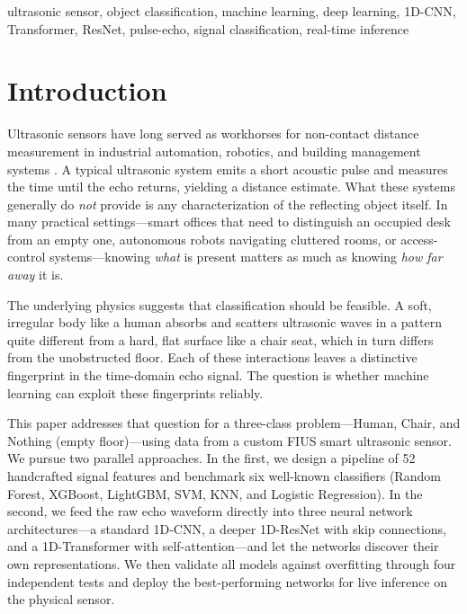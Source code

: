 \documentclass[conference,a4paper]{IEEEtran}
\begin{document}
\begin{IEEEkeywords}
ultrasonic sensor, object classification, machine learning, deep learning, 1D-CNN, Transformer, ResNet, pulse-echo, signal classification, real-time inference
\end{IEEEkeywords}

\section{Introduction}

Ultrasonic sensors have long served as workhorses for non-contact distance measurement in industrial automation, robotics, and building management systems \cite{carullo2001}. A typical ultrasonic system emits a short acoustic pulse and measures the time until the echo returns, yielding a distance estimate. What these systems generally do \emph{not} provide is any characterization of the reflecting object itself. In many practical settings---smart offices that need to distinguish an occupied desk from an empty one, autonomous robots navigating cluttered rooms, or access-control systems---knowing \emph{what} is present matters as much as knowing \emph{how far away} it is.

The underlying physics suggests that classification should be feasible. A soft, irregular body like a human absorbs and scatters ultrasonic waves in a pattern quite different from a hard, flat surface like a chair seat, which in turn differs from the unobstructed floor. Each of these interactions leaves a distinctive fingerprint in the time-domain echo signal. The question is whether machine learning can exploit these fingerprints reliably.

This paper addresses that question for a three-class problem---Human, Chair, and Nothing (empty floor)---using data from a custom FIUS smart ultrasonic sensor. We pursue two parallel approaches. In the first, we design a pipeline of 52 handcrafted signal features and benchmark six well-known classifiers (Random Forest, XGBoost, LightGBM, SVM, KNN, and Logistic Regression). In the second, we feed the raw echo waveform directly into three neural network architectures---a standard 1D-CNN, a deeper 1D-ResNet with skip connections, and a 1D-Transformer with self-attention---and let the networks discover their own representations. We then validate all models against overfitting through four independent tests and deploy the best-performing networks for live inference on the physical sensor.
\end{document}
